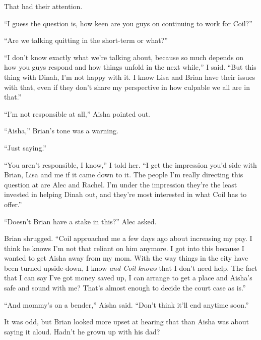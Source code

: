 That had their attention.



``I guess the question is, how keen are you guys on continuing to work for Coil?''



``Are we talking quitting in the short-term or what?''



``I don't know exactly what we're talking about, because so much depends on how you guys respond and how things unfold in the next while,'' I said.  ``But this thing with Dinah, I'm not happy with it.  I know Lisa and Brian have their issues with that, even if they don't share my perspective in how culpable we all are in that.''



``I'm not responsible at all,'' Aisha pointed out.



``Aisha,'' Brian's tone was a warning.



``Just saying.''



``You aren't responsible, I know,'' I told her.  ``I get the impression you'd side with Brian, Lisa and me if it came down to it.  The people I'm really directing this question at are Alec and Rachel.  I'm under the impression they're the least invested in helping Dinah out, and they're most interested in what Coil has to offer.''



``Doesn't Brian have a stake in this?'' Alec asked.



Brian shrugged.  ``Coil approached me a few days ago about increasing my pay.  I think he knows I'm not that reliant on him anymore.  I got into this because I wanted to get Aisha away from my mom.  With the way things in the city have been turned upside-down, I know \emph{and Coil knows} that I don't need help.  The fact that I can say I've got money saved up, I can arrange to get a place and Aisha's safe and sound with me?  That's almost enough to decide the court case as is.''



``And mommy's on a bender,'' Aisha said.  ``Don't think it'll end anytime soon.''



It was odd, but Brian looked more upset at hearing that than Aisha was about saying it aloud.  Hadn't he grown up with his dad?



